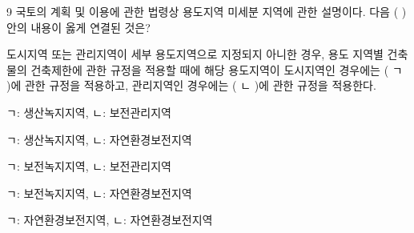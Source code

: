 \begin{question}{9}
국토의 계획 및 이용에 관한 법령상 용도지역 미세분 지역에 관한 설명이다. 다음 ( )안의 내용이 옳게 연결된 것은?
\begin{framedtext}
도시지역 또는 관리지역이 세부 용도지역으로 지정되지 아니한 경우, 용도 지역별 건축물의 건축제한에 관한 규정을 적용할 때에 해당 용도지역이 도시지역인 경우에는 ( ㄱ )에 관한 규정을 적용하고, 관리지역인 경우에는 ( ㄴ )에 관한 규정을 적용한다. \par
\end{framedtext}
\begin{choices}
  \item ㄱ: 생산녹지지역, ㄴ: 보전관리지역
  \item ㄱ: 생산녹지지역, ㄴ: 자연환경보전지역
  \item ㄱ: 보전녹지지역, ㄴ: 보전관리지역
  \item ㄱ: 보전녹지지역, ㄴ: 자연환경보전지역
  \item ㄱ: 자연환경보전지역, ㄴ: 자연환경보전지역
\end{choices}
\end{question}
